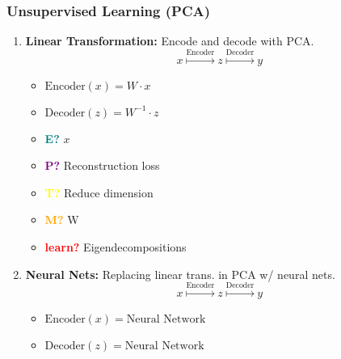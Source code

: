 \subsubsection{Unsupervised Learning (PCA)}
\begin{example} 
    \begin{enumerate}
        \item \textbf{Linear Transformation:} Encode and decode with PCA.
        \begin{equation}
            x \overset{\text{Encoder}}{\mapsto} z \overset{\text{Decoder}}{\mapsto} y
        \end{equation}
        \begin{itemize}
            \item $\text{Encoder}(x) = W \cdot x$
            \item $\text{Decoder}(z) = W^{-1} \cdot z$
        \end{itemize}
        \vspace{1em}
    
        \begin{itemize}
            \item \textcolor{teal}{\textbf{E?}} $x$
            \item \textcolor{purple}{\textbf{P?}} Reconstruction loss
            \item \textcolor{yellow}{\textbf{T?}} Reduce dimension
            \item \textcolor{orange}{\textbf{M?}} W
            \item \textcolor{red}{\textbf{learn?}} Eigendecompositions
        \end{itemize}
        \item \textbf{Neural Nets:} Replacing linear trans. in PCA w/ neural nets.
        \begin{equation}
            x \overset{\text{Encoder}}{\mapsto} z \overset{\text{Decoder}}{\mapsto} y
        \end{equation}
        \begin{itemize}
            \item $\text{Encoder}(x) = \text{Neural Network}$
            \item $\text{Decoder}(z) = \text{Neural Network}$
        \end{itemize}
    \end{enumerate}
\end{example}
\newpage

